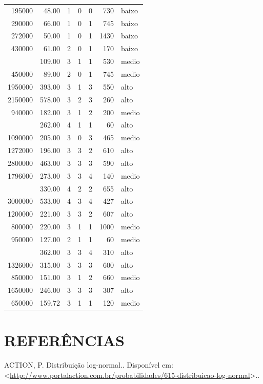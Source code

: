\documentclass[a4paper]{article}
\begin{document}
\begin{table}[H]
\begin{tabular}{rrrrrrl}
195000 & 48.00 & 1 & 0 & 0 & 730 & baixo\\
290000 & 66.00 & 1 & 0 & 1 & 745 & baixo\\
272000 & 50.00 & 1 & 0 & 1 & 1430 & baixo\\
430000 & 61.00 & 2 & 0 & 1 & 170 & baixo\\
\addlinespace
895000 & 109.00 & 3 & 1 & 1 & 530 & medio\\
450000 & 89.00 & 2 & 0 & 1 & 745 & medio\\
1950000 & 393.00 & 3 & 1 & 3 & 550 & alto\\
2150000 & 578.00 & 3 & 2 & 3 & 260 & alto\\
940000 & 182.00 & 3 & 1 & 2 & 200 & medio\\
\addlinespace
1400000 & 262.00 & 4 & 1 & 1 & 60 & alto\\
1090000 & 205.00 & 3 & 0 & 3 & 465 & medio\\
1272000 & 196.00 & 3 & 3 & 2 & 610 & alto\\
2800000 & 463.00 & 3 & 3 & 3 & 590 & alto\\
1796000 & 273.00 & 3 & 3 & 4 & 140 & medio\\
\addlinespace
1400000 & 330.00 & 4 & 2 & 2 & 655 & alto\\
3000000 & 533.00 & 4 & 3 & 4 & 427 & alto\\
1200000 & 221.00 & 3 & 3 & 2 & 607 & alto\\
800000 & 220.00 & 3 & 1 & 1 & 1000 & medio\\
950000 & 127.00 & 2 & 1 & 1 & 60 & medio\\
\addlinespace
2061000 & 362.00 & 3 & 3 & 4 & 310 & alto\\
1326000 & 315.00 & 3 & 3 & 3 & 600 & alto\\
850000 & 151.00 & 3 & 1 & 2 & 660 & medio\\
1650000 & 246.00 & 3 & 3 & 3 & 307 & alto\\
650000 & 159.72 & 3 & 1 & 1 & 120 & medio\\
\bottomrule
\end{tabular}
\end{table}

\section*{REFERÊNCIAS}\label{referencias}

\hypertarget{refs}{}
\hypertarget{ref-portalaction}{}
ACTION, P. Distribuição log-normal.. Disponível em:
\textless{}\url{http://www.portalaction.com.br/probabilidades/615-distribuicao-log-normal}\textgreater{}..
\end{document}
